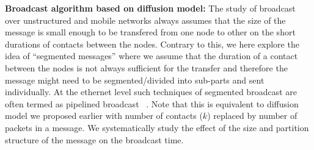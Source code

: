 \noindent
{\bf Broadcast algorithm based on diffusion model:} The study of broadcast over unstructured and mobile networks always assumes that the 
size of the message is  small enough to be transfered from one node to other 
on the short durations of contacts between the nodes. 
Contrary to this, we here explore
 the idea of ``segmented messages'' where we assume that the duration of a contact 
between the nodes is not always sufficient for the transfer and therefore the message might need to be 
segmented/divided into sub-parts and sent individually. 
At the ethernet level such techniques of segmented broadcast are often termed as pipelined broadcast 
~\cite{patarasuk2008techniques, watts1995pipelined}. Note that this is equivalent to diffusion model we proposed earlier with number of contacts ($k$) replaced by number 
of packets in a message. 
We systematically study the effect of the size and partition structure of the message on the broadcast time.


